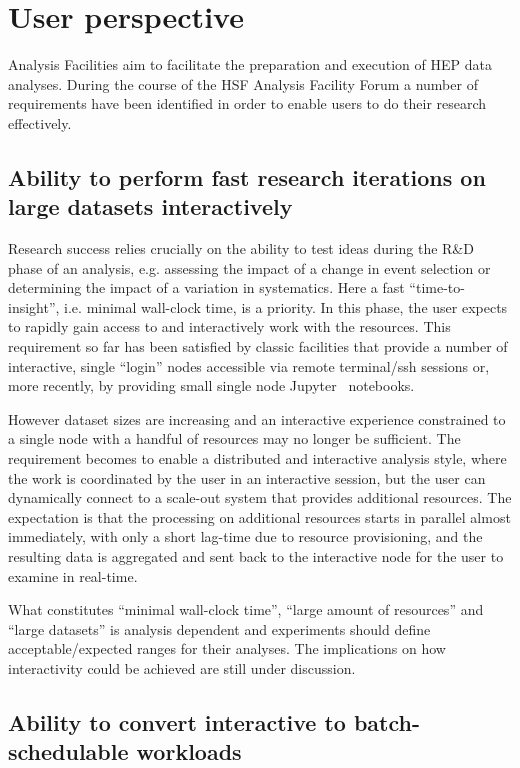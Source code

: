 \section{User perspective}
\label{userperspective}

Analysis Facilities aim to facilitate the preparation and execution of HEP data analyses. During the course of the HSF Analysis Facility Forum a number of requirements have been identified in order to enable users to do their research effectively. 

\subsection*{Ability to perform fast research iterations on large datasets interactively}

Research success relies crucially on the ability to test ideas during the R\&D phase of an analysis, e.g. assessing the impact of a change in event selection or determining the impact of a variation in systematics. Here a fast “time-to-insight”, i.e. minimal wall-clock time, is a priority. In this phase, the user expects to rapidly gain access to and interactively work with the resources. This requirement so far has been satisfied by classic facilities that provide a number of interactive, single “login” nodes accessible via remote terminal/ssh sessions or, more recently, by providing small single node Jupyter~\cite{jupyter} notebooks. 


However dataset sizes are increasing and an interactive experience constrained to a single node with a handful of resources may no longer be sufficient. The requirement becomes to enable a distributed and interactive analysis style, where the work is coordinated by the user in an interactive session, but the user can dynamically connect to a scale-out system that provides additional resources. The expectation is that the processing on additional resources starts in parallel almost immediately, with only a short lag-time due to resource provisioning, and the resulting data is aggregated and sent back to the interactive node for the user to examine in real-time. 

What constitutes “minimal wall-clock time”, “large amount of resources” and “large datasets” is analysis dependent and experiments should define acceptable/expected ranges for their analyses. The implications on how interactivity could be achieved are still under discussion. 

\subsection*{Ability to convert interactive to batch-schedulable workloads}

